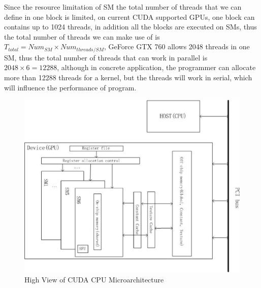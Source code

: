 \documentclass[12pt,a4paper,final]{article}
\begin{document}
\begin{spacing}{2.5}
   Since the resource limitation of SM the total number of threads that we can define in one block is limited, on current CUDA supported GPUs, one block can contains up to 1024 threads, in addition all the blocks are executed on SMs, thus the total number of threads we can make use of is $T_{total}=Num_{SM}\times Num_{threads/SM}$, GeForce GTX 760 allows 2048 threads in one SM, thus the total number of threads that can work in parallel is $2048\times 6=12288$, although in concrete application, the programmer can allocate more than 12288 threads for a kernel, but the threads will work in serial, which will influence the performance of program. 
\begin{figure}[htb]
\centering
\includegraphics[scale=0.5]{High_view_of_CUDA_GPU_microarchitecture.eps}
\caption{High View of CUDA CPU Microarchitecture}
\label{figure2}
\end{figure}   

\end{spacing}
\end{document}
